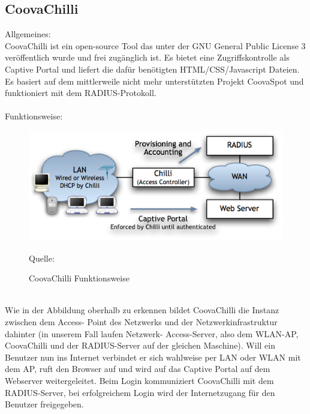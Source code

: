 \subsection{CoovaChilli}
Allgemeines:\\
CoovaChilli ist ein open-source Tool das unter der GNU General Public License 3 veröffentlich wurde und frei zugänglich ist. Es bietet eine Zugriffskontrolle als Captive Portal und liefert die dafür benötigten HTML/CSS/Javascript Dateien. Es basiert auf dem mittlerweile nicht mehr unterstützten Projekt CoovaSpot und funktioniert mit dem RADIUS-Protokoll.\\
~\\
Funktionsweise:
\begin{figure}[ht]                                                                              
\includegraphics[width=\textwidth]{pictures/Tom/Chilli}
\caption{CoovaChilli Funktionsweise}
Quelle: \cite{chilli2}
\end{figure}
~\\
Wie in der Abbildung oberhalb zu erkennen bildet CoovaChilli die Instanz zwischen dem Access-
Point des Netzwerks und der Netzwerkinfrastruktur dahinter (in unserem Fall laufen Netzwerk-
Access-Server, also dem WLAN-AP, CoovaChilli und der RADIUS-Server auf der gleichen Maschine).
Will ein Benutzer nun ins Internet verbindet er sich wahlweise per LAN oder WLAN mit dem AP,
ruft den Browser auf und wird auf das Captive Portal auf dem Webserver weitergeleitet. Beim
Login kommuniziert CoovaChilli mit dem RADIUS-Server, bei erfolgreichem Login wird der
Internetzugang für den Benutzer freigegeben.

